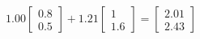 \documentclass[preview]{standalone}
\begin{document}
\begin{align*}
1.00 \begin{bmatrix} 0.8 \\ 0.5 \end{bmatrix} + 1.21 \begin{bmatrix} 1 \\ 1.6 \end{bmatrix} = \begin{bmatrix} 2.01 \\ 2.43 \end{bmatrix}
\end{align*}
\end{document}
